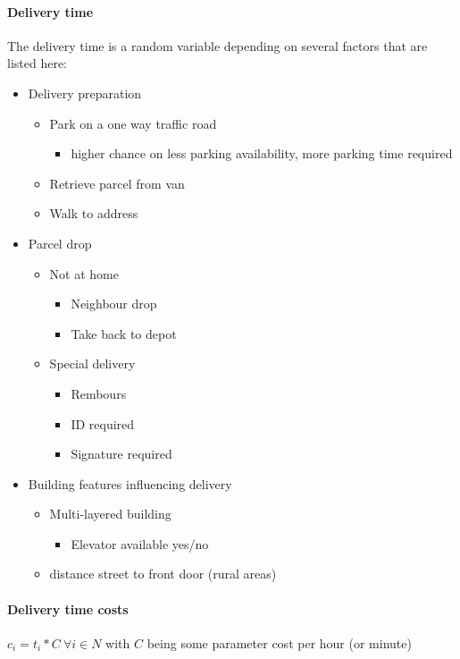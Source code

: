\documentclass[a4paper,10pt,twoside]{report}
\begin{document}
\paragraph{Delivery time}
The delivery time is a random variable depending on several factors that are listed here: 
\begin{itemize}
\item Delivery preparation
\begin{itemize}
\item Park on a one way traffic road 
\begin{itemize}
\item higher chance on less parking availability, more parking time required
\end{itemize}
\item Retrieve parcel from van
\item Walk to address
\end{itemize}
\item Parcel drop
\begin{itemize}
\item Not at home
\begin{itemize}
\item Neighbour drop
\item Take back to depot
\end{itemize}
\item Special delivery
\begin{itemize}
\item Rembours
\item ID required
\item Signature required
\end{itemize}
\end{itemize}
\item Building features influencing delivery
\begin{itemize}
\item Multi-layered building
\begin{itemize}
\item Elevator available yes/no
\end{itemize}
\item distance street to front door (rural areas)
\end{itemize}
\end{itemize}

\paragraph{Delivery time costs}
$c_{i} = t_{i}*C\ \forall i \in N$
with $C$ being some parameter cost per hour (or minute)


\end{document}
